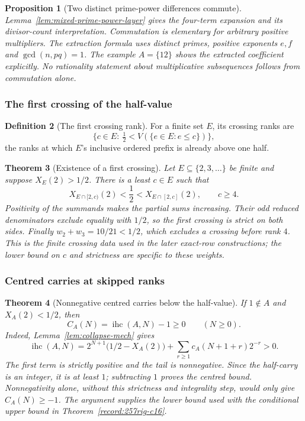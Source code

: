 \documentclass[11pt]{article}
\theoremstyle{plain}
\newtheorem{thm}{Theorem}[section]
\newtheorem{prop}[thm]{Proposition}
\theoremstyle{definition}
\newtheorem{defn}[thm]{Definition}
\theoremstyle{remark}
\newcommand{\lean}[2]{\leanlink{#2}}
\begin{document}
\begin{prop}[Two distinct prime-power differences commute]\label{record:257rig-i5}
Lemma~\ref{lem:mixed-prime-power-layer} gives the four-term expansion
and its divisor-count interpretation.  Commutation is elementary
for arbitrary positive multipliers.  The extraction formula uses
distinct primes, \emph{positive} exponents $e,f$ and $\gcd(n,pq)=1$.
The example $A=\{12\}$ shows the extracted coefficient explicitly.
No rationality statement about multiplicative subsequences follows
from commutation alone.
\end{prop}

\subsubsection*{The first crossing of the half-value}

\begin{defn}[The first crossing rank]\label{record:257bm-i-cross}
For a finite set $E$, its crossing ranks are
\[
\bigl\{c\in E:\ \tfrac12 < \ensuremath{V}(\{e\in E:e\le c\})\bigr\},
\]
the ranks at which $E$'s inclusive ordered prefix is already above one half.
\par\noindent   \lean{localMersenneCrossingRanks}{BooleanMobiusExactRowCrossing.lean:24}
\end{defn}

\begin{thm}[Existence of a first crossing]\label{record:257bm-i-cross2}
Let $E\subseteq\{2,3,\ldots\}$ be finite and suppose $X_E(2)>1/2$.
There is a least $c\in E$ such that
\[
 X_{E\cap[2,c)}(2)<\frac12
       <X_{E\cap[2,c]}(2),\qquad c\ge4.
\]
Positivity of the summands makes the partial sums increasing.  Their
odd reduced denominators exclude equality with $1/2$, so the first
crossing is strict on both sides.  Finally
$w_2+w_3=10/21<1/2$, which excludes a crossing before rank $4$.
This is the finite crossing data used in the later exact-row
constructions; the lower bound on $c$ and strictness are specific
to these weights.
\end{thm}

\subsubsection*{Centred carries at skipped ranks}

\begin{thm}[Nonnegative centred carries below the half-value]\label{record:257hg-i6}
If $1\notin A$ and $X_A(2)<1/2$, then
\[
 C_A(N)=\operatorname{ihc}(A,N)-1\ge0\qquad(N\ge0).
\]
Indeed, Lemma~\ref{lem:collapse-mech} gives
\[
 \operatorname{ihc}(A,N)
 =2^{N+1}\bigl(1/2-X_A(2)\bigr)
     +\sum_{r\ge1}c_A(N+1+r)2^{-r}>0.
\]
The first term is strictly positive and the tail is nonnegative.
Since the half-carry is an integer, it is at least $1$; subtracting
$1$ proves the centred bound.  Nonnegativity alone, without this
strictness and integrality step, would only give $C_A(N)\ge-1$.
The argument supplies the lower bound used with the conditional
upper bound in Theorem~\ref{record:257rig-c16}.
\end{thm}
\end{document}
